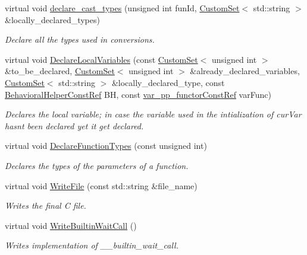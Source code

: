 \begin{DoxyCompactItemize}
virtual void \hyperlink{classCWriter_abe7dc69f7739cf009bd2e943a60d1920}{declare\+\_\+cast\+\_\+types} (unsigned int fun\+Id, \hyperlink{custom__set_8hpp_a615bc2f42fc38a4bb1790d12c759e86f}{Custom\+Set}$<$ std\+::string $>$ \&locally\+\_\+declared\+\_\+types)
\begin{DoxyCompactList}\small\item\em Declare all the types used in conversions. \end{DoxyCompactList}\item 
virtual void \hyperlink{classCWriter_ab269f8330141bcdeecda80a23e60c8f5}{Declare\+Local\+Variables} (const \hyperlink{custom__set_8hpp_a615bc2f42fc38a4bb1790d12c759e86f}{Custom\+Set}$<$ unsigned int $>$ \&to\+\_\+be\+\_\+declared, \hyperlink{custom__set_8hpp_a615bc2f42fc38a4bb1790d12c759e86f}{Custom\+Set}$<$ unsigned int $>$ \&already\+\_\+declared\+\_\+variables, \hyperlink{custom__set_8hpp_a615bc2f42fc38a4bb1790d12c759e86f}{Custom\+Set}$<$ std\+::string $>$ \&locally\+\_\+declared\+\_\+type, const \hyperlink{behavioral__helper_8hpp_aae973b54cac87eef3b27442aa3e1e425}{Behavioral\+Helper\+Const\+Ref} BH, const \hyperlink{var__pp__functor_8hpp_a8a6b51b6519401d911398943510557f0}{var\+\_\+pp\+\_\+functor\+Const\+Ref} var\+Func)
\begin{DoxyCompactList}\small\item\em Declares the local variable; in case the variable used in the intialization of cur\+Var hasn\textquotesingle{}t been declared yet it get declared. \end{DoxyCompactList}\item 
virtual void \hyperlink{classCWriter_a0a14899d7e4f403c1ee6e612566cd9f4}{Declare\+Function\+Types} (const unsigned int)
\begin{DoxyCompactList}\small\item\em Declares the types of the parameters of a function. \end{DoxyCompactList}\item 
virtual void \hyperlink{classCWriter_ad526446c6dd856accaca4a90b3a64f25}{Write\+File} (const std\+::string \&file\+\_\+name)
\begin{DoxyCompactList}\small\item\em Writes the final C file. \end{DoxyCompactList}\item 
virtual void \hyperlink{classCWriter_ad3407e20cd7eb648efe844771d3fe80f}{Write\+Builtin\+Wait\+Call} ()
\begin{DoxyCompactList}\small\item\em Writes implementation of \+\_\+\+\_\+builtin\+\_\+wait\+\_\+call. \end{DoxyCompactList}\end{DoxyCompactItemize}
